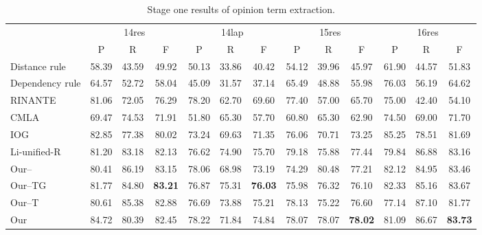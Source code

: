 \documentclass[letterpaper]{article} \usepackage{aaai20}  \usepackage{times}  \usepackage{helvet} \usepackage{courier}  \usepackage[hyphens]{url}  \usepackage{graphicx} \urlstyle{rm} \def\UrlFont{\rm}  \usepackage{graphicx}  \frenchspacing  \setlength{\pdfpagewidth}{8.5in}  \setlength{\pdfpageheight}{11in}
\begin{document}
\begin{table*}[t]
\caption{Stage one results of opinion term extraction.}
\label{tab:stage1_opt}
\begin{small}
\centering
\begin{tabular}{l|ccc|ccc|ccc|ccc}
\hline
 & \multicolumn{3}{c|}{14res}                       & \multicolumn{3}{c|}{14lap}                       & \multicolumn{3}{c|}{15res}              & \multicolumn{3}{c}{16res}                       \\ \cline{2-13} 
                  & P              & R              & F              & P              & R              & F              & P              & R              & F     & P              & R              & F              \\ \hline
Distance rule     & 58.39          & 43.59          & 49.92          & 50.13          & 33.86          & 40.42          & 54.12          & 39.96          & 45.97 & 61.90          & 44.57          & 51.83          \\
Dependency rule   & 64.57          & 52.72          & 58.04          & 45.09          & 31.57          & 37.14          & 65.49          & 48.88          & 55.98 & 76.03          & 56.19          & 64.62          \\
RINANTE           & 81.06          & 72.05          & 76.29          & 78.20          & 62.70          & 69.60          & 77.40          & 57.00          & 65.70 & 75.00          & 42.40          & 54.10          \\
CMLA              & 69.47          & 74.53          & 71.91          & 51.80          & 65.30          & 57.70          & 60.80          & 65.30          & 62.90 & 74.50          & 69.00          & 71.70          \\
IOG               & 82.85 & 77.38          & 80.02          & 73.24          & 69.63          & 71.35          & 76.06          & 70.71          & 73.25 & 85.25 & 78.51          & 81.69          \\
Li-unified-R & 81.20          & 83.18 & 82.13         & 76.62          & 74.90 & 75.70          & 79.18 & 75.88          & 77.44 & 79.84          & 86.88 & 83.16          \\\hline
Our--     & 80.41          & 86.19          & 83.15          & 78.06          & 68.98          & 73.19          & 74.29          & 80.48 & 77.21 & 82.12          & 84.95          & 83.46          \\
Our--TG            & 81.77 & 84.80          & \textbf{83.21} & 76.87          & 75.31 & \textbf{76.03} & 75.98          & 76.32          & 76.10 & 82.33 & 85.16          & 83.67          \\
Our--T     					       & 80.61 & 85.38         & 82.88 & 76.69         & 73.88 & 75.21 & 78.13          & 75.22         & 76.60 & 77.14 & 87.10         & 81.77         \\
Our               & 84.72         & 80.39 & 82.45 & 78.22 & 71.84          & 74.84          & 78.07 & 78.07 & \textbf{78.02} & 81.09          & 86.67 & \textbf{83.73} \\ \hline
\end{tabular}


\end{small}
\end{table*}
\end{document}
